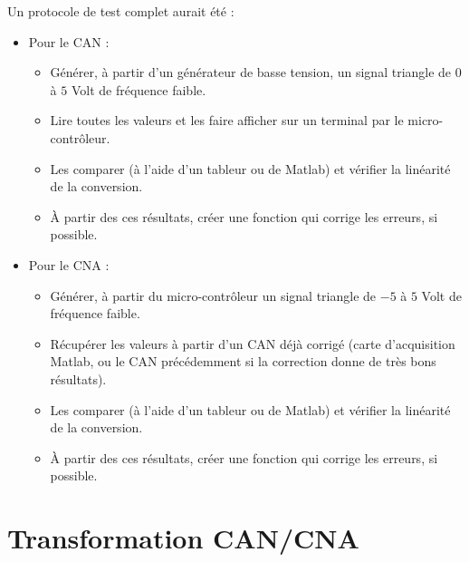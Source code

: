 Un protocole de test complet aurait été :\\
\begin{itemize}
\item Pour le CAN : 
	\begin{itemize}
		\item Générer, à partir d'un générateur de basse tension, un signal triangle de $0$ à $5$ Volt de fréquence faible.
		\item Lire toutes les valeurs et les faire afficher sur un terminal par le micro-contrôleur.
		\item Les comparer (à l'aide d'un tableur ou de Matlab) et vérifier la linéarité de la conversion.
		\item À partir des ces résultats, créer une fonction qui corrige les erreurs, si possible.
	\end{itemize}

\item Pour le CNA :
	\begin{itemize}
		\item Générer, à partir du micro-contrôleur un signal triangle de $-5$ à $5$ Volt de fréquence faible.
		\item Récupérer les valeurs à partir d'un CAN déjà corrigé (carte d'acquisition Matlab, ou le CAN précédemment si la correction donne de très bons résultats).
		\item Les comparer (à l'aide d'un tableur ou de Matlab) et vérifier la linéarité de la conversion.
		\item À partir des ces résultats, créer une fonction qui corrige les erreurs, si possible.
	\end{itemize}
\end{itemize}




\section{Transformation CAN/CNA}
